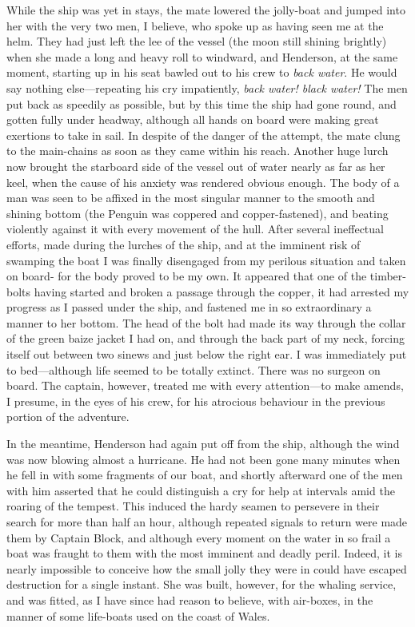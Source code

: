 While the ship was yet in stays, the mate lowered the jolly-boat and jumped
into her with the very two men, I believe, who spoke up as having seen me at the
helm. They had just left the lee of the vessel (the moon still shining brightly)
when she made a long and heavy roll to windward, and Henderson, at the same
moment, starting up in his seat bawled out to his crew to \emph{back water}. He
would say nothing else---repeating his cry impatiently, \emph{back water! black
water!} The men put back as speedily as possible, but by this time the ship
had gone round, and gotten fully under headway, although all hands on board were
making great exertions to take in sail. In despite of the danger of the attempt,
the mate clung to the main-chains as soon as they came within his reach. Another
huge lurch now brought the starboard side of the vessel out of water nearly as
far as her keel, when the cause of his anxiety was rendered obvious enough. The
body of a man was seen to be affixed in the most singular manner to the smooth
and shining bottom (the Penguin was coppered and copper-fastened), and beating
violently against it with every movement of the hull. After several ineffectual
efforts, made during the lurches of the ship, and at the imminent risk of
swamping the boat I was finally disengaged from my perilous situation and taken
on board- for the body proved to be my own. It appeared that one of the
timber-bolts having started and broken a passage through the copper, it had
arrested my progress as I passed under the ship, and fastened me in so
extraordinary a manner to her bottom. The head of the bolt had made its way
through the collar of the green baize jacket I had on, and through the back part
of my neck, forcing itself out between two sinews and just below the right ear.
I was immediately put to bed---although life seemed to be totally extinct. There
was no surgeon on board. The captain, however, treated me with every
attention---to make amends, I presume, in the eyes of his crew, for his
atrocious behaviour in the previous portion of the adventure. 

In the meantime, Henderson had again put off from the ship, although the wind
was now blowing almost a hurricane. He had not been gone many minutes when he
fell in with some fragments of our boat, and shortly afterward one of the men
with him asserted that he could distinguish a cry for help at intervals amid the
roaring of the tempest. This induced the hardy seamen to persevere in their
search for more than half an hour, although repeated signals to return were made
them by Captain Block, and although every moment on the water in so frail a boat
was fraught to them with the most imminent and deadly peril. Indeed, it is
nearly impossible to conceive how the small jolly they were in could have
escaped destruction for a single instant. She was built, however, for the
whaling service, and was fitted, as I have since had reason to believe, with
air-boxes, in the manner of some life-boats used on the coast of Wales. 

